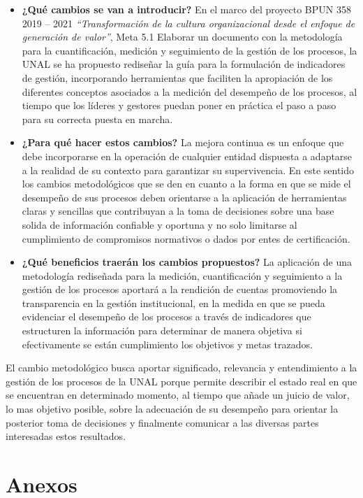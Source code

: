 \documentclass[
]{book}
\begin{document}
\begin{itemize}
\item
  \textbf{¿Qué cambios se van a introducir?} En el marco del proyecto BPUN 358 2019 -- 2021 \emph{``Transformación de la cultura organizacional desde el enfoque de generación de valor''}, Meta 5.1 Elaborar un documento con la metodología para la cuantificación, medición y seguimiento de la gestión de los procesos, la UNAL se ha propuesto rediseñar la guía para la formulación de indicadores de gestión, incorporando herramientas que faciliten la apropiación de los diferentes conceptos asociados a la medición del desempeño de los procesos, al tiempo que los líderes y gestores puedan poner en práctica el paso a paso para su correcta puesta en marcha.
\item
  \textbf{¿Para qué hacer estos cambios?} La mejora continua es un enfoque que debe incorporarse en la operación de cualquier entidad dispuesta a adaptarse a la realidad de su contexto para garantizar su supervivencia. En este sentido los cambios metodológicos que se den en cuanto a la forma en que se mide el desempeño de sus procesos deben orientarse a la aplicación de herramientas claras y sencillas que contribuyan a la toma de decisiones sobre una base solida de información confiable y oportuna y no solo limitarse al cumplimiento de compromisos normativos o dados por entes de certificación.
\item
  \textbf{¿Qué beneficios traerán los cambios propuestos?} La aplicación de una metodología rediseñada para la medición, cuantificación y seguimiento a la gestión de los procesos aportará a la rendición de cuentas promoviendo la transparencia en la gestión institucional, en la medida en que se pueda evidenciar el desempeño de los procesos a través de indicadores que estructuren la información para determinar de manera objetiva si efectivamente se están cumplimiento los objetivos y metas trazados.
\end{itemize}

El cambio metodológico busca aportar significado, relevancia y entendimiento a la gestión de los procesos de la UNAL porque permite describir el estado real en que se encuentran en determinado momento, al tiempo que añade un juicio de valor, lo mas objetivo posible, sobre la adecuación de su desempeño para orientar la posterior toma de decisiones y finalmente comunicar a las diversas partes interesadas estos resultados.

\hypertarget{anexos}{%
\chapter{Anexos}\label{anexos}}
\end{document}
